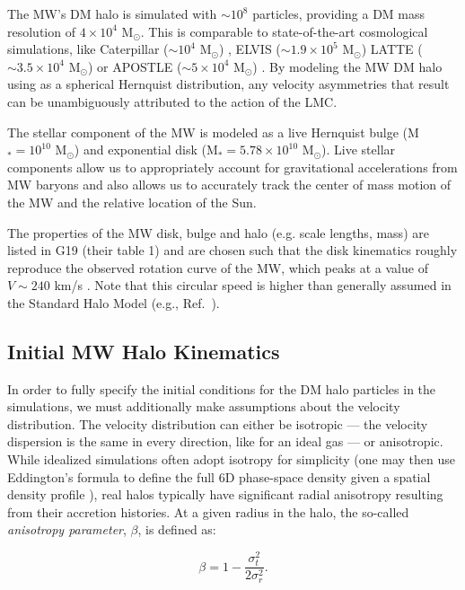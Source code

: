 \documentclass[letterpaper,11pt]{article}
\begin{document}
The MW's DM halo is simulated with $\sim 10^8$ particles, providing a DM mass resolution of $4 \times 10^4$ M$_\odot$. This is comparable to state-of-the-art cosmological simulations, like Caterpillar ($\sim 10^4$ M$_\odot$) \cite{Griffen2016}, ELVIS ($\sim 1.9 \times 10^5$ M$_\odot$) \cite{GarrisonKimmel2014} 
 LATTE ($\sim 3.5 \times 10^4$ M$_\odot$) \cite{Wetzel2016} or APOSTLE ($\sim 5\times 10^4$ M$_\odot$) 
 \cite{Sawala:2016}.
 By modeling the MW DM halo using as a spherical Hernquist distribution, any velocity
 asymmetries that result can be unambiguously attributed to the action of the LMC.

 The stellar component of the MW is modeled as a live 
 Hernquist bulge (M$_* = 10^{10}$ M$_\odot$) and exponential disk (M$_* = 5.78 \times 10^{10}$ M$_\odot$). Live stellar components allow us to appropriately account for 
 gravitational accelerations from MW baryons and also allows us to accurately track 
 the center of mass motion of the MW and the relative location of the Sun. 

 The properties of the MW disk, bulge and halo (e.g. scale lengths, mass) are 
 listed in G19 (their table 1) and are chosen such that the disk 
 kinematics roughly reproduce the observed
 rotation curve of the MW, which peaks at a value of $V \sim 240$ km/s \citep{McMillan:2011, McMillan:2017}.
 Note that this 
 circular speed is higher than generally assumed in the Standard Halo Model
 (e.g., Ref.~\cite{Herzog:2018}). 
 
 
\subsection{Initial MW Halo Kinematics}
\label{sec:initialkinematics}

In order to fully specify the initial conditions for the DM halo particles in the simulations, we must additionally make assumptions about the velocity distribution.  The velocity distribution can either be isotropic --- the velocity dispersion is the same in every direction, like for an ideal gas --- or anisotropic.  While idealized simulations often adopt isotropy for simplicity (one may then use Eddington's formula to define the full 6D phase-space density given a spatial density profile \cite{Binney:2008}), real halos typically have significant radial anisotropy resulting from their accretion histories.  At a given radius in the halo, the so-called
\textit{anisotropy parameter}, $\beta$,  is defined as:

\begin{equation}
\beta = 1 - \dfrac{\sigma_t^2}{2\sigma_r^2} .
\end{equation}
\end{document}
